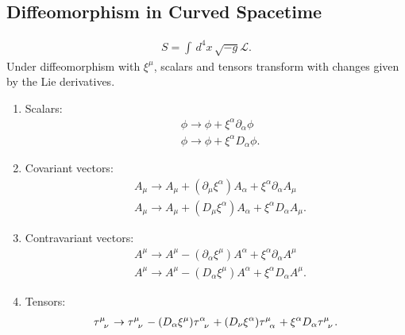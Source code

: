 \documentclass{book}
\numberwithin{equation}{section}
\theoremstyle{definition}
\newcommand{\p}{\partial}
\newcommand{\lag}{\mathcal{L}}
\begin{document}
\subsection{Diffeomorphism in Curved Spacetime}
\begin{align}
S = \int \,d^4x \,\sqrt{-g}\lag.
\end{align}
Under diffeomorphism with $\xi^\mu$, scalars and tensors transform with changes given by the Lie derivatives. 
\begin{enumerate}
	\item Scalars: 
	\begin{align}
	&\phi \to \phi + \xi^\alpha \p_\alpha \phi\\
	&\phi \to \phi + \xi^\alpha D_\alpha \phi.
	\end{align}
	
	\item Covariant vectors: 
	\begin{align}
	&A_\mu \to A_\mu + (\p_\mu\xi^\alpha)A_\alpha + \xi^\alpha \p_\alpha A_\mu\\
	&A_\mu \to A_\mu + (D_\mu\xi^\alpha)A_\alpha + \xi^\alpha D_\alpha A_\mu.
	\end{align}
	
	\item Contravariant vectors:
	\begin{align}
	&A^\mu \to A^\mu - (\p_\alpha \xi^\mu)A^\alpha + \xi^\alpha \p_\alpha A^\mu\\
	&A^\mu \to A^\mu - (D_\alpha \xi^\mu)A^\alpha + \xi^\alpha D_\alpha A^\mu.
	\end{align}
	
	\item Tensors:
	\begin{align}
	\tensor{\tau}{^\mu_\nu} \to \tensor{\tau}{^\mu_\nu} - (D_\alpha\xi^\mu)\tensor{\tau}{^\alpha_\nu} + (D_\nu\xi^\alpha)\tensor{\tau}{^\mu_\alpha} + \xi^\alpha D_\alpha\tensor{\tau}{^\mu_\nu}.
	\end{align}	
	
\end{enumerate}
\end{document}
